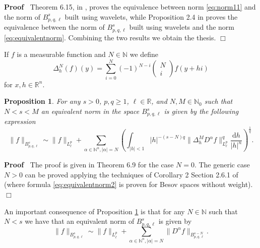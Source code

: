 \documentclass[a4paper,10pt]{article}
\newcommand{\mathd}{\mathrm{d}}
\newenvironment{proof}{\noindent\textbf{Proof\ }}{\hspace*{\fill}$\Box$\medskip}
\newtheorem{proposition}[theorem]{Proposition}
{\theorembodyfont{\rmfamily}\newtheorem{remark}[theorem]{Remark}}
\begin{document}
\begin{proof}
  Theorem 6.15, in {\cite{Triebel2006}}, proves the equivalence between norm
  {\eqref{eq:norm11}} and the norm of $B^s_{p, q, \ell}$ built using wavelets,
  while Proposition 2.4 in {\cite{HaiLabb2017}} proves the equivalence between
  the norm of $B^s_{p, q, \ell}$ built using wavelets and the norm
  {\eqref{eq:equivalentnorm}}. Combining the two results we obtain the thesis.
\end{proof}

If $f$ is a measurable function and $N \in \mathbb{N}$ we define
\[ \Delta^N_h (f) (y) = \sum_{i = 0}^N (- 1)^{N - i} \left( \begin{array}{c}
     N\\
     i
   \end{array} \right) f (y + h i) \]
for $x, h \in \mathbb{R}^n$.

\begin{proposition}
  \label{proposition_difference}For any $s > 0$, $p, q \geqslant 1$, $\ell \in
  \mathbb{R}$, and $N, M \in \mathbb{N}_0$ such that $N < s < M$ an equivalent
  norm in the space $B^s_{p, q, \ell}$ is given by the following expression
  \begin{equation}
    \| f \|_{B^s_{p, q, \ell}} \sim \| f \|_{L^p_{\ell}} + \sum_{\alpha \in
    \mathbb{N}^n, | \alpha | = N} \left( \int_{| h | < 1} | h |^{- (s - N) q}
    \| \Delta_h^M D^{\alpha} f \|_{L^p_{\ell}}^q \frac{\mathd h}{| h |^n}
    \right)^{\frac{1}{q}} . \label{eq:equivalentnorm2}
  \end{equation}
\end{proposition}

\begin{proof}
  The proof is given in {\cite{Triebel2006}} Theorem 6.9 for the case $N = 0$.
  The generic case $N > 0$ can be proved applying the techniques of Corollary
  2 Section 2.6.1 of {\cite{Triebel1992}} (where formula
  {\eqref{eq:equivalentnorm2}} is proven for Besov spaces without weight).
\end{proof}

\begin{remark}
  \label{remark_equivalentnorm}An important consequence of Proposition
  \ref{proposition_difference} is that for any $N \in \mathbb{N}$ such that $N
  < s$ we have that an equivalent norm of $B^s_{p, q, \ell}$ is given by
  \begin{equation}
    \| f \|_{B^s_{p, q, \ell}} \sim \| f \|_{L^p_{\ell}} + \sum_{\alpha \in
    \mathbb{N}^n, | \alpha | = N} \| D^{\alpha} f \|_{B^{s - N}_{p, q, \ell}}
    . \label{eq:equivalentenorm3}
  \end{equation}
\end{remark}
\end{document}
